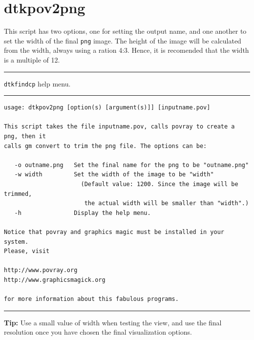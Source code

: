 \section{dtkpov2png}

This script has two options, one for setting the output name, and one another to set the width of the final \texttt{png} image. The height of the image will be calculated from the width, always using a ration 4:3. Hence, it is recomended that the width is a multiple of 12.

\rule{\textwidth}{1pt}
{\center\texttt{dtkfindcp} help menu.\\}
\rule{\textwidth}{1pt}
\begin{footnotesize}
\begin{verbatim}
usage: dtkpov2png [option(s) [argument(s)]] [inputname.pov]

This script takes the file inputname.pov, calls povray to create a png, then it
calls gm convert to trim the png file. The options can be:

   -o outname.png   Set the final name for the png to be "outname.png"
   -w width         Set the width of the image to be "width"
                      (Default value: 1200. Since the image will be trimmed, 
                       the actual width will be smaller than "width".)
   -h               Display the help menu.

Notice that povray and graphics magic must be installed in your system.
Please, visit

http://www.povray.org
http://www.graphicsmagick.org

for more information about this fabulous programs.
\end{verbatim}
\end{footnotesize}
\rule{\textwidth}{1pt}

\textbf{Tip:} Use a small value of width when testing the view, and use the final resolution once you have chosen the final visualization options.



